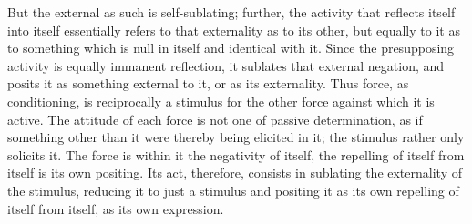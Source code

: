 But the external as such is self-sublating;
further, the activity that reflects
itself into itself essentially refers to
that externality as to its other,
but equally to it as to something
which is null in itself and identical with it.
Since the presupposing activity is
equally immanent reflection,
it sublates that external negation,
and posits it as something external to it,
or as its externality.
Thus force, as conditioning,
is reciprocally a stimulus for the other force
against which it is active.
The attitude of each force is not one
of passive determination,
as if something other than it were
thereby being elicited in it;
the stimulus rather only solicits it.
The force is within it the negativity of itself,
the repelling of itself from itself is its own positing.
Its act, therefore, consists in sublating
the externality of the stimulus,
reducing it to just a stimulus
and positing it as its own repelling
of itself from itself,
as its own expression.

